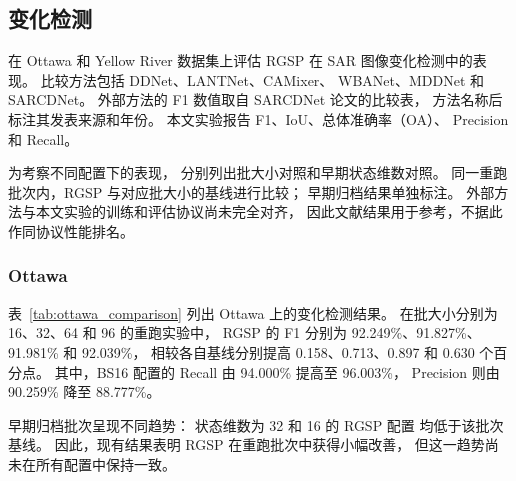 \subsection{变化检测}
\label{sec:change_detection_results}

在 Ottawa 和 Yellow River 数据集上评估 RGSP
在 SAR 图像变化检测中的表现。
比较方法包括 DDNet、LANTNet、CAMixer、
WBANet、MDDNet 和 SARCDNet。
外部方法的 F1 数值取自 SARCDNet 论文的比较表，
方法名称后标注其发表来源和年份。
本文实验报告 F1、IoU、总体准确率（OA）、
Precision 和 Recall。

为考察不同配置下的表现，
分别列出批大小对照和早期状态维数对照。
同一重跑批次内，RGSP 与对应批大小的基线进行比较；
早期归档结果单独标注。
外部方法与本文实验的训练和评估协议尚未完全对齐，
因此文献结果用于参考，不据此作同协议性能排名。

\subsubsection{Ottawa}
\label{sec:ottawa_results}

表~\ref{tab:ottawa_comparison}
列出 Ottawa 上的变化检测结果。
在批大小分别为 16、32、64 和 96 的重跑实验中，
RGSP 的 F1 分别为
92.249\%、91.827\%、91.981\% 和 92.039\%，
相较各自基线分别提高
0.158、0.713、0.897 和 0.630 个百分点。
其中，BS16 配置的 Recall
由 94.000\% 提高至 96.003\%，
Precision 则由 90.259\% 降至 88.777\%。

早期归档批次呈现不同趋势：
状态维数为 32 和 16 的 RGSP 配置
均低于该批次基线。
因此，现有结果表明 RGSP 在重跑批次中获得小幅改善，
但这一趋势尚未在所有配置中保持一致。

